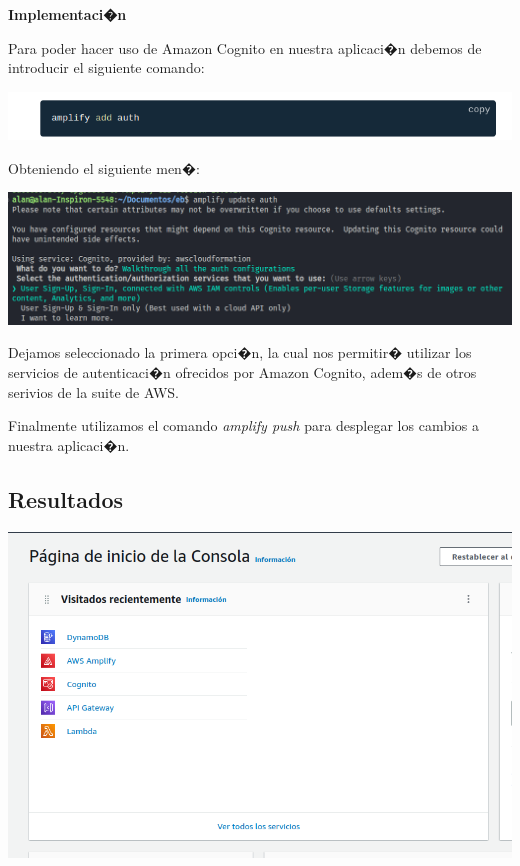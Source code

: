 \documentclass[12pt,letterpaper]{article}
\begin{document}
\textbf{Implementaci�n}

Para poder hacer uso de Amazon Cognito en nuestra aplicaci�n debemos de introducir el siguiente comando:

\begin{center}
  \includegraphics[scale=0.7]{imagenes/add}
 \label{fig:cognito} 
\end{center} 

Obteniendo el siguiente men�:

\begin{center}
  \includegraphics[scale=0.5]{imagenes/menu}
 \label{fig:cognito} 
\end{center} 

Dejamos seleccionado la primera opci�n, la cual nos permitir� utilizar los servicios de autenticaci�n ofrecidos por Amazon Cognito, adem�s de otros serivios de la suite de AWS.

Finalmente utilizamos el comando \emph{amplify push} para desplegar los cambios a nuestra aplicaci�n.





\subsection{Resultados}

\begin{center}
  \includegraphics[scale=0.5]{imagenes/console}
 \label{fig:cognito} 
\end{center} 
\end{document}
